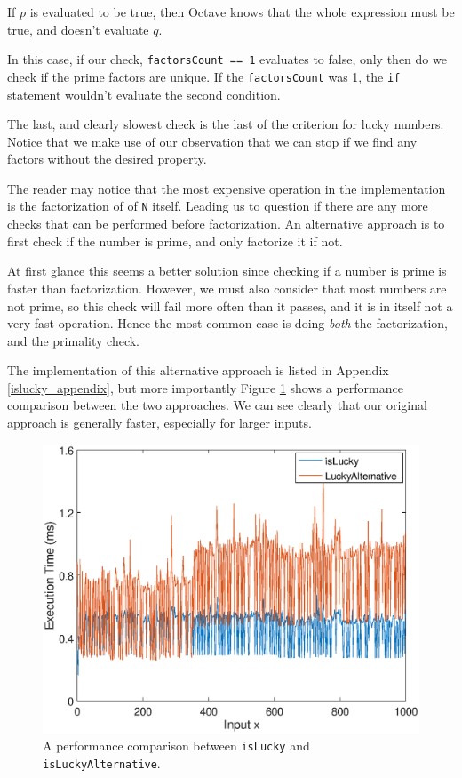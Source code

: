 \documentclass[10pt]{article}
\begin{document}
If $p$ is evaluated to be true, then Octave knows that the whole expression must be true, and doesn't evaluate $q$. 

In this case, if our check, \texttt{factorsCount == 1} evaluates to false, only then do we check if the prime factors are unique. If the \texttt{factorsCount} was 1, the \texttt{if} statement wouldn't evaluate the second condition.

The last, and clearly slowest check is the last  of the criterion for lucky numbers. Notice that we make use of our observation that we can stop if we find any factors without the desired property.

The reader may notice that the most expensive operation in the implementation is the factorization of of \texttt{N} itself. Leading us to question if there are any more checks that can be performed before factorization. An alternative approach is to first check if the number is prime, and only factorize it if not.

At first glance this seems a better solution since checking if a number is prime is faster than factorization. However, we must also consider that most numbers are not prime, so this check will fail more often than it passes, and it is in itself not a very fast operation. Hence the most common case is doing \emph{both} the factorization, and the primality check.


The implementation of this alternative approach is listed in Appendix \ref{islucky_appendix}, but more importantly Figure \ref{isluckytest} shows a performance comparison between the two approaches. We can see clearly that our original approach is generally faster, especially for larger inputs.


\begin{figure}[h]

   \includegraphics[scale=0.5]{islucky_test.eps}

   \caption{A performance comparison between \texttt{isLucky} and \texttt{isLuckyAlternative}.}
      \label{isluckytest}
\end{figure}
\end{document}
